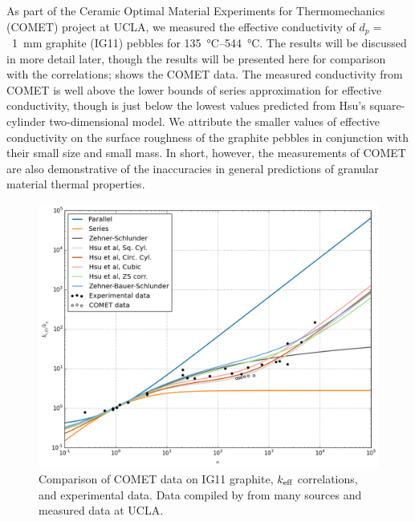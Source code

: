As part of the Ceramic Optimal Material Experiments for Thermomechanics (COMET) project at UCLA, we measured the effective conductivity of $d_p = $~\SI{1}{\milli\meter} graphite (IG11) pebbles for \SIrange{135}{544}{\celsius}. The results will be discussed in more detail later, though the results will be presented here for comparison with the correlations;  shows the COMET data. The measured conductivity from COMET is well above the lower bounds of series approximation for effective conductivity, though is just below the lowest values predicted from Hsu\etal's square-cylinder two-dimensional model. We attribute the smaller values of effective conductivity on the surface roughness of the graphite pebbles in conjunction with their small size and small mass. In short, however, the measurements of COMET are also demonstrative of the inaccuracies in general predictions of granular material thermal properties.

\begin{figure}[!h]
    \centering
    \includegraphics[width=\singleimagewidth]{figures/keff-kappa-experimental-comet}
    \caption{Comparison of COMET data on IG11 graphite, $k_\text{eff}$ correlations, and experimental data. Data compiled by \cite{VanAntwerpen2010} from many sources and measured data at UCLA.}
    \label{fig:kappa-experimental-comet}
\end{figure}













